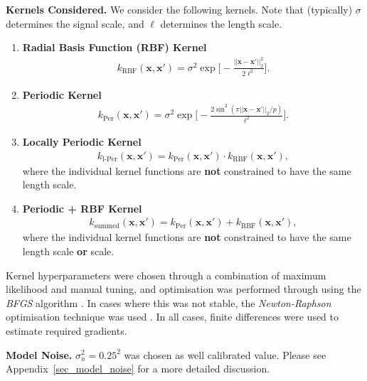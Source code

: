 \documentclass[a4paper, twocolumn, 10pt]{article}
\begin{document}
\noindent\textbf{Kernels Considered.} We consider the following kernels. Note that (typically) $\sigma$ determines the signal scale, and $\ell$ determines the length scale. \begin{enumerate}[label=\Alph{enumi}.]
	\item \textbf{Radial Basis Function (RBF) Kernel}
	\begin{align}
	k_{\text{RBF}}(\bm{x}, \bm{x}') = \sigma^2 \exp \Big[ - \frac{|| \bm{x} - \bm{x}' ||_2^2}{2 \ell^2} \Big].
	\end{align}
	\item \textbf{Periodic Kernel}
	\begin{align}
	k_\text{Per}(\bm{x}, \bm{x}') = \sigma^2 \exp \Big[ - \frac{ 2 \sin^2 (\pi || \bm{x} - \bm{x}'||_2 / p)}{\ell^2} \Big].
	\end{align}
	\item \textbf{Locally Periodic Kernel}
	\begin{align}
	k_\text{l-Per}(\bm{x}, \bm{x}') = k_\text{Per}(\bm{x}, \bm{x}') \cdot k_{\text{RBF}}(\bm{x}, \bm{x}'),
	\end{align}
	where the individual kernel functions are \textbf{not} constrained to have the same length scale. 
	\item \textbf{Periodic + RBF Kernel}
	\begin{align}
	k_\text{summed}(\bm{x}, \bm{x}') = k_\text{Per}(\bm{x}, \bm{x}') + k_{\text{RBF}}(\bm{x}, \bm{x}'),
	\end{align}
	where the individual kernel functions are \textbf{not} constrained to have the same length scale \textbf{or} scale. 
\end{enumerate}

Kernel hyperparameters were chosen through a combination of maximum likelihood and manual tuning, and optimisation was performed through using the \emph{BFGS} algorithm \citep{BFGS}. In cases where this was not stable, the \emph{Newton-Raphson} optimisation technique was used \citep{newt}. In all cases, finite differences were used to estimate required gradients. 

\noindent\textbf{Model Noise.} $\sigma_n^2 = 0.25^2$ was chosen as well calibrated value. Please see Appendix~\ref{sec_model_noise} for a more detailed discussion.
\end{document}
